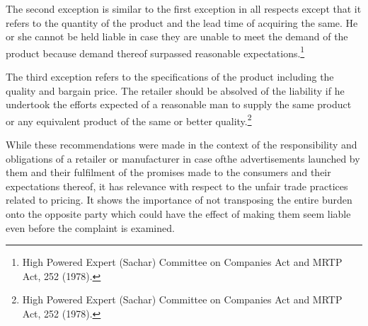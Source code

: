 \begin{multicols}{2}
\noi
The second exception is similar to the first exception in all respects except that it refers to the
quantity of the product and the lead time of acquiring the same. He or she cannot be held liable
in case they are unable to meet the demand of the product because demand thereof surpassed
reasonable expectations.\footnote{High Powered Expert (Sachar) Committee on Companies Act and MRTP Act, 252 (1978).}

\noi
The third exception refers to the specifications of the product including the quality and bargain
price. The retailer should be absolved of the liability if he undertook the efforts expected of a
reasonable man to supply the same product or any equivalent product of the same or better
quality.\footnote{High Powered Expert (Sachar) Committee on Companies Act and MRTP Act, 252 (1978).}

\noi
While these recommendations were made in the context of the responsibility and obligations of a retailer or manufacturer in case ofthe advertisements launched by them and their fulfilment of the promises made to the consumers and their expectations thereof, it has relevance with respect to the unfair trade practices related to pricing. It shows the importance of not transposing the entire burden onto the opposite party which could have the effect of making them seem liable even before the complaint is examined.



\end{multicols}
